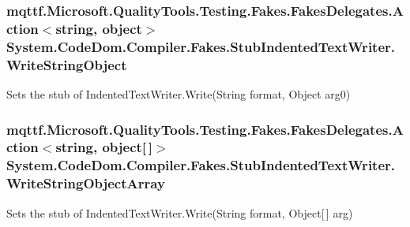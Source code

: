\hypertarget{class_system_1_1_code_dom_1_1_compiler_1_1_fakes_1_1_stub_indented_text_writer_a6f6b0db90741ae579ebc2766b20adccc}{
\subsubsection[{Write\-String\-Object}]{\setlength{\rightskip}{0pt plus 5cm}mqttf.\-Microsoft.\-Quality\-Tools.\-Testing.\-Fakes.\-Fakes\-Delegates.\-Action$<$string, object$>$ System.\-Code\-Dom.\-Compiler.\-Fakes.\-Stub\-Indented\-Text\-Writer.\-Write\-String\-Object}}\label{class_system_1_1_code_dom_1_1_compiler_1_1_fakes_1_1_stub_indented_text_writer_a6f6b0db90741ae579ebc2766b20adccc}


Sets the stub of Indented\-Text\-Writer.\-Write(\-String format, Object arg0)

\hypertarget{class_system_1_1_code_dom_1_1_compiler_1_1_fakes_1_1_stub_indented_text_writer_a338d17c30b28ce5a431ddb2de68b2afc}{
\subsubsection[{Write\-String\-Object\-Array}]{\setlength{\rightskip}{0pt plus 5cm}mqttf.\-Microsoft.\-Quality\-Tools.\-Testing.\-Fakes.\-Fakes\-Delegates.\-Action$<$string, object\mbox{[}$\,$\mbox{]}$>$ System.\-Code\-Dom.\-Compiler.\-Fakes.\-Stub\-Indented\-Text\-Writer.\-Write\-String\-Object\-Array}}\label{class_system_1_1_code_dom_1_1_compiler_1_1_fakes_1_1_stub_indented_text_writer_a338d17c30b28ce5a431ddb2de68b2afc}


Sets the stub of Indented\-Text\-Writer.\-Write(\-String format, Object\mbox{[}$\,$\mbox{]} arg)

